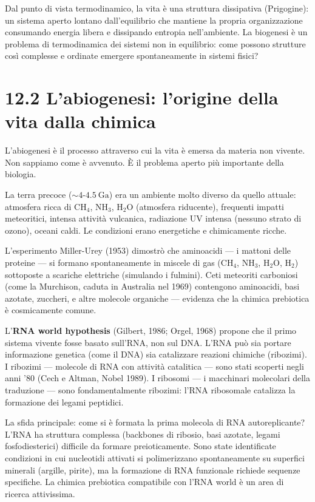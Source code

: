 \documentclass[11.5pt,a4paper,openany]{book}
\theoremstyle{remark}
\begin{document}
Dal punto di vista termodinamico, la vita è una struttura dissipativa (Prigogine): un sistema aperto lontano dall'equilibrio che mantiene la propria organizzazione consumando energia libera e dissipando entropia nell'ambiente. La biogenesi è un problema di termodinamica dei sistemi non in equilibrio: come possono strutture così complesse e ordinate emergere spontaneamente in sistemi fisici?

\section{12.2 L'abiogenesi: l'origine della vita dalla chimica}

L'abiogenesi è il processo attraverso cui la vita è emersa da materia non vivente. Non sappiamo come è avvenuto. È il problema aperto più importante della biologia.

La terra precoce ($\sim 4$-$4.5\ \text{Ga}$) era un ambiente molto diverso da quello attuale: atmosfera ricca di $\text{CH}_4$, $\text{NH}_3$, $\text{H}_2\text{O}$ (atmosfera riducente), frequenti impatti meteoritici, intensa attività vulcanica, radiazione UV intensa (nessuno strato di ozono), oceani caldi. Le condizioni erano energetiche e chimicamente ricche.

L'esperimento Miller-Urey (1953) dimostrò che aminoacidi --- i mattoni delle proteine --- si formano spontaneamente in miscele di gas (CH$_4$, NH$_3$, H$_2$O, H$_2$) sottoposte a scariche elettriche (simulando i fulmini). Ceti meteoriti carboniosi (come la Murchison, caduta in Australia nel 1969) contengono aminoacidi, basi azotate, zuccheri, e altre molecole organiche --- evidenza che la chimica prebiotica è cosmicamente comune.

L'\textbf{RNA world hypothesis} (Gilbert, 1986; Orgel, 1968) propone che il primo sistema vivente fosse basato sull'RNA, non sul DNA. L'RNA può sia portare informazione genetica (come il DNA) sia catalizzare reazioni chimiche (ribozimi). I ribozimi --- molecole di RNA con attività catalitica --- sono stati scoperti negli anni '80 (Cech e Altman, Nobel 1989). I ribosomi --- i macchinari molecolari della traduzione --- sono fondamentalmente ribozimi: l'RNA ribosomale catalizza la formazione dei legami peptidici.

La sfida principale: come si è formata la prima molecola di RNA autoreplicante? L'RNA ha struttura complessa (backbones di ribosio, basi azotate, legami fosfodiesterici) difficile da formare preioticamente. Sono state identificate condizioni in cui nucleotidi attivati si polimerizzano spontaneamente su superfici minerali (argille, pirite), ma la formazione di RNA funzionale richiede sequenze specifiche. La chimica prebiotica compatibile con l'RNA world è un area di ricerca attivissima.
\end{document}
